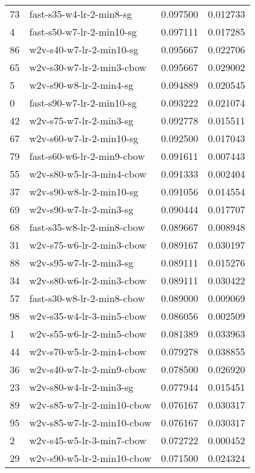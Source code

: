{\begin{tabular}{llrr}
73 &     fast-s35-w4-lr-2-min8-sg &  0.097500 &  0.012733 \\
4  &    fast-s50-w7-lr-2-min10-sg &  0.097111 &  0.017285 \\
86 &     w2v-s40-w7-lr-2-min10-sg &  0.095667 &  0.022706 \\
65 &    w2v-s30-w7-lr-2-min3-cbow &  0.095667 &  0.029002 \\
5  &      w2v-s90-w8-lr-2-min4-sg &  0.094889 &  0.020545 \\
0  &    fast-s90-w7-lr-2-min10-sg &  0.093222 &  0.021074 \\
42 &      w2v-s75-w7-lr-2-min3-sg &  0.092778 &  0.015511 \\
67 &     w2v-s60-w7-lr-2-min10-sg &  0.092500 &  0.017043 \\
79 &   fast-s60-w6-lr-2-min9-cbow &  0.091611 &  0.007443 \\
55 &    w2v-s80-w5-lr-3-min4-cbow &  0.091333 &  0.002404 \\
37 &     w2v-s90-w8-lr-2-min10-sg &  0.091056 &  0.014554 \\
69 &      w2v-s90-w7-lr-2-min3-sg &  0.090444 &  0.017707 \\
68 &   fast-s35-w8-lr-2-min8-cbow &  0.089667 &  0.008948 \\
31 &    w2v-s75-w6-lr-2-min3-cbow &  0.089167 &  0.030197 \\
88 &      w2v-s95-w7-lr-2-min3-sg &  0.089111 &  0.015276 \\
34 &    w2v-s80-w6-lr-2-min3-cbow &  0.089111 &  0.030422 \\
57 &   fast-s30-w8-lr-2-min8-cbow &  0.089000 &  0.009069 \\
98 &    w2v-s35-w4-lr-3-min5-cbow &  0.086056 &  0.002509 \\
1  &    w2v-s55-w6-lr-2-min5-cbow &  0.081389 &  0.033963 \\
44 &    w2v-s70-w5-lr-2-min4-cbow &  0.079278 &  0.038855 \\
36 &    w2v-s40-w7-lr-2-min9-cbow &  0.078500 &  0.026920 \\
23 &      w2v-s80-w4-lr-2-min3-sg &  0.077944 &  0.015451 \\
89 &   w2v-s85-w7-lr-2-min10-cbow &  0.076167 &  0.030317 \\
95 &   w2v-s85-w7-lr-2-min10-cbow &  0.076167 &  0.030317 \\
2  &    w2v-s45-w5-lr-3-min7-cbow &  0.072722 &  0.000452 \\
29 &   w2v-s90-w5-lr-2-min10-cbow &  0.071500 &  0.024324 \\

\end{tabular}}
